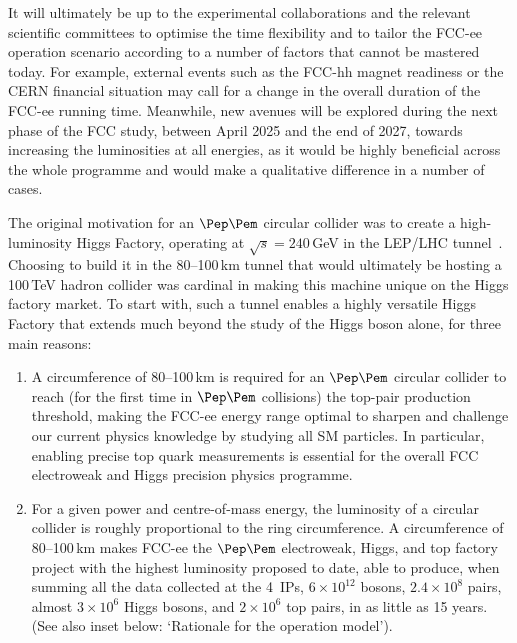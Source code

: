 It will ultimately be up to the experimental collaborations and the relevant scientific committees to optimise the time flexibility 
and to tailor the FCC-ee operation scenario according to a number of factors that cannot be mastered today. 
For example, external events such as the FCC-hh magnet readiness or the CERN financial situation may call for a change in the overall duration of the FCC-ee running time. 
Meanwhile, new avenues will be explored during the next phase of the FCC study, between April 2025 and the end of 2027, 
towards increasing the luminosities at all energies, 
as it would be highly beneficial across the whole programme and would make a qualitative difference in a number of cases. 

The original motivation for an $\Pep\Pem$ circular collider was to create a high-luminosity Higgs Factory, operating at $\sqrt{s}=240$\,GeV in the LEP/LHC tunnel~\cite{Blondel:2011fua,Blondel:2012ey,Azzi:2012yn}. 
Choosing to build it in the 80--100\,km tunnel that would ultimately be hosting a 100\,TeV hadron collider was cardinal in making this machine unique on the Higgs factory market. 
To start with, such a tunnel enables a highly versatile Higgs Factory that extends much beyond the study of the Higgs boson alone, for three main reasons:

\begin{enumerate}
\item A circumference of 80--100\,km is required for an $\Pep\Pem$ circular collider to reach (for the first time in $\Pep\Pem$ collisions) the top-pair production threshold, making the FCC-ee energy range optimal to sharpen and challenge our current physics knowledge by studying all SM particles. 
In particular, enabling precise top quark measurements is essential for the overall FCC electroweak and Higgs precision physics programme.

\vspace{0.4cm}

\item For a given power and centre-of-mass energy, the luminosity of a circular collider is roughly proportional to the ring circumference. 
A circumference of 80--100\,km makes FCC-ee the $\Pep\Pem$ electroweak, Higgs, and top factory project with the highest luminosity proposed to date, able to produce, when summing all the data collected at the 4~IPs, $6\times 10^{12}$ \PZ bosons, $2.4\times 10^{8}$ \PW pairs, almost $3\times 10^6$ Higgs bosons, and $2\times 10^6$ top pairs, in as little as 15 years. 
(See also inset below: `Rationale for the operation model').
\end{enumerate}

